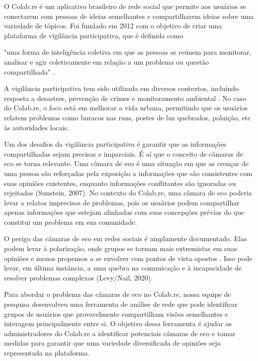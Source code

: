 O Colab.re é um aplicativo brasileiro de rede social que permite aos usuários se conectarem com pessoas de ideias semelhantes e compartilharem ideias sobre uma variedade de tópicos. Foi fundado em 2012 com o objetivo de criar uma plataforma de vigilância participativa, que é definida como
\begin{citacao}
    "uma forma de inteligência coletiva em que as pessoas se reúnem para monitorar, analisar e agir coletivamente em relação a um problema ou questão compartilhada" \cite[p. 1]{2011_Bryer}.
\end{citacao}

A vigilância participativa tem sido utilizada em diversos contextos, incluindo resposta a desastres, prevenção de crimes e monitoramento ambiental \cite[text]{2009_Girardin}. No caso do Colab.re, o foco está em melhorar a vida urbana, permitindo que os usuários relatem problemas como buracos nas ruas, postes de luz quebrados, poluição, etc às autoridades locais.

Um dos desafios da vigilância participativa é garantir que as informações compartilhadas sejam precisas e imparciais. É aí que o conceito de câmaras de eco se torna relevante. Uma câmara de eco é uma situação em que as crenças de uma pessoa são reforçadas pela exposição a informações que são consistentes com suas opiniões existentes, enquanto informações conflitantes são ignoradas ou rejeitadas (Sunstein, 2007). No contexto do Colab.re, uma câmara de eco poderia levar a relatos imprecisos de problemas, pois os usuários podem compartilhar apenas informações que estejam alinhadas com suas concepções prévias do que constitui um problema em sua comunidade.

O perigo das câmaras de eco em redes sociais é amplamente documentado. Elas podem levar à polarização, onde grupos se tornam mais extremistas em suas opiniões e menos propensos a se envolver com pontos de vista opostos \cite[text]{2001_Sunstein_BOOK}. Isso pode levar, em última instância, a uma quebra na comunicação e à incapacidade de resolver problemas complexos (Levy/Nail, 2020).

Para abordar o problema das câmaras de eco no Colab.re, nossa equipe de pesquisa desenvolveu uma ferramenta de análise de rede que pode identificar grupos de usuários que provavelmente compartilham visões semelhantes e interagem principalmente entre si. O objetivo dessa ferramenta é ajudar os administradores do Colab.re a identificar potenciais câmaras de eco e tomar medidas para garantir que uma variedade diversificada de opiniões seja representada na plataforma.